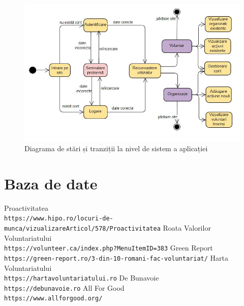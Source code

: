 \documentclass[12pt,a4paper]{report}
\begin{document}
\begin{figure}[h!]
\centering
  \includegraphics[width=0.9\linewidth]{stateMachine.JPG}
  \caption{Diagrama de stări și tranziții la nivel de sistem a aplicației}
\end{figure}


\chapter{Baza de date}





\begin{thebibliography}{1}
Proactivitatea
\\\texttt{https://www.hipo.ro/locuri-de-munca/vizualizareArticol/578/Proactivitatea}
Roata Valorilor Voluntariatului
\\\texttt{https://volunteer.ca/index.php?MenuItemID=383}
Green Report
\\\texttt{https://green-report.ro/3-din-10-romani-fac-voluntariat/}
Harta Voluntariatului
\\\texttt{https://hartavoluntariatului.ro}
De Bunavoie
\\\texttt{https://debunavoie.ro}
All For Good
\\\texttt{https://www.allforgood.org/}
\end{thebibliography}
\end{document}
